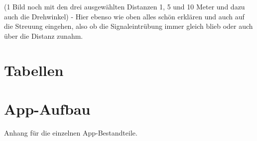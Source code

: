
(1 Bild noch mit den drei ausgewählten Distanzen 1, 5 und 10 Meter und dazu auch die Drehwinkel) - Hier ebenso wie oben alles schön erklären und auch auf die Streuung eingehen, also ob die Signaleintrübung immer gleich blieb oder auch über die Distanz zunahm.
\section{Tabellen}


\section{App-Aufbau}
Anhang für die einzelnen App-Bestandteile.

